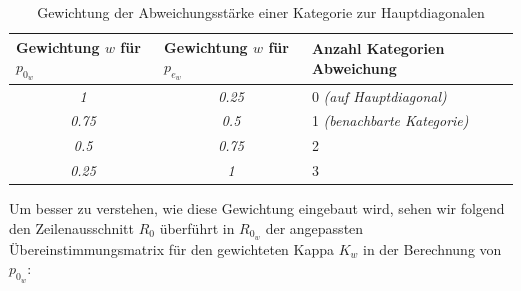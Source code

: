 \begin{table}[H]
\centering
\vspace{-.5em}
\caption[Gewichtung der Abweichungsstärke einer Kategorie zur Hauptdiagonalen]{Gewichtung der Abweichungsstärke einer Kategorie zur Hauptdiagonalen}
\label{tab:GewichtungAbweichungenKappaBerechnung}
\vspace{-.5em}
\footnotesize
\renewcommand*{\arraystretch}{1.2}
\begin{tabular}{ccl}
\hline
\multicolumn{1}{l}{\textbf{Gewichtung $w$ für $p_{0_{w}}$}} & \multicolumn{1}{l}{\textbf{Gewichtung $w$ für $p_{e_{w}}$}} & \textbf{Anzahl Kategorien Abweichung} \\ \hline
\textit{1}                                     				& \textit{0.25}                                     	& 0 \textit{(auf Hauptdiagonal)}                 \\ 
\textit{0.75}                                      		& \textit{0.5}                                      		& 1 \textit{(benachbarte Kategorie)}             \\ 
\textit{0.5}                                     			& \textit{0.75}                                     	& 2                                     \\ 
\textit{0.25}                                        		& \textit{1}                                        		& 3                                     \\ \hline
\end{tabular}
\vspace{-2em}
\end{table}

Um besser zu verstehen, wie diese Gewichtung eingebaut wird, sehen wir folgend den Zeilenausschnitt $R_0$ überführt in $R_{0_{w}}$ der angepassten Übereinstimmungsmatrix für den gewichteten Kappa $K_w$ in der Berechnung von $p_{0_{w}}$:


